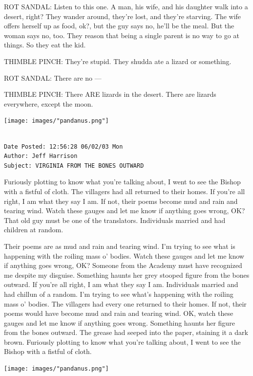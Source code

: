 \documentclass[
]{memoir}
\begin{document}
ROT SANDAL: Listen to this one. A man, his wife, and his daughter walk
into a desert, right? They wander around, they're lost, and they're
starving. The wife offers herself up as food, ok?, but the guy says no,
he'll be the meal. But the woman says no, too. They reason that being a
single parent is no way to go at things. So they eat the kid.

THIMBLE PINCH: They're stupid. They shudda ate a lizard or something.

ROT SANDAL: There are no ---

THIMBLE PINCH: There ARE lizards in the desert. There are lizards
everywhere, except the moon.

\begin{center}\texttt{[image: images/"pandanus.png"]}\end{center}

\begin{verbatim}

Date Posted: 12:56:28 06/02/03 Mon
Author: Jeff Harrison
Subject: VIRGINIA FROM THE BONES OUTWARD
\end{verbatim}

Furiously plotting to know what you're talking about, I went to see the
Bishop with a fistful of cloth. The villagers had all returned to their
homes. If you're all right, I am what they say I am. If not, their poems
become mud and rain and tearing wind. Watch these gauges and let me know
if anything goes wrong, OK? That old guy must be one of the translators.
Individuals married and had children at random.

Their poems are as mud and rain and tearing wind. I'm trying to see what
is happening with the roiling mass o' bodies. Watch these gauges and let
me know if anything goes wrong, OK? Someone from the Academy must have
recognized me despite my disguise. Something haunts her grey stooped
figure from the bones outward. If you're all right, I am what they say I
am. Individuals married and had chillun of a random. I'm trying to see
what's happening with the roiling mass o' bodies. The villagers had
every one returned to their homes. If not, their poems would have become
mud and rain and tearing wind. OK, watch these gauges and let me know if
anything goes wrong. Something haunts her figure from the bones outward.
The grease had seeped into the paper, staining it a dark brown.
Furiously plotting to know what you're talking about, I went to see the
Bishop with a fistful of cloth.

\begin{center}\texttt{[image: images/"pandanus.png"]}\end{center}
\end{document}
